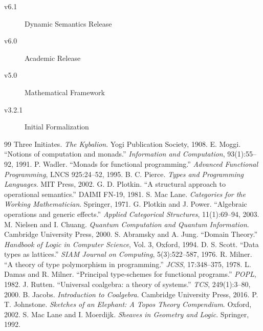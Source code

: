 \documentclass[11pt,twoside,openright]{book}
\theoremstyle{definition}
\theoremstyle{plain}
\theoremstyle{remark}
\begin{document}
\begin{description}
\item[v6.1] Dynamic Semantics Release

\item[v6.0] Academic Release

\item[v5.0] Mathematical Framework

\item[v3.2.1] Initial Formalization
\end{description}

\backmatter

\begin{thebibliography}{99}
 Three Initiates. \textit{The Kybalion}. Yogi Publication Society, 1908.
 E. Moggi. ``Notions of computation and monads.'' \textit{Information and Computation}, 93(1):55--92, 1991.
 P. Wadler. ``Monads for functional programming.'' \textit{Advanced Functional Programming}, LNCS 925:24--52, 1995.
 B. C. Pierce. \textit{Types and Programming Languages}. MIT Press, 2002.
 G. D. Plotkin. ``A structural approach to operational semantics.'' DAIMI FN-19, 1981.
 S. Mac Lane. \textit{Categories for the Working Mathematician}. Springer, 1971.
 G. Plotkin and J. Power. ``Algebraic operations and generic effects.'' \textit{Applied Categorical Structures}, 11(1):69--94, 2003.
 M. Nielsen and I. Chuang. \textit{Quantum Computation and Quantum Information}. Cambridge University Press, 2000.
 S. Abramsky and A. Jung. ``Domain Theory.'' \textit{Handbook of Logic in Computer Science}, Vol. 3, Oxford, 1994.
 D. S. Scott. ``Data types as lattices.'' \textit{SIAM Journal on Computing}, 5(3):522--587, 1976.
 R. Milner. ``A theory of type polymorphism in programming.'' \textit{JCSS}, 17:348--375, 1978.
 L. Damas and R. Milner. ``Principal type-schemes for functional programs.'' \textit{POPL}, 1982.
 J. Rutten. ``Universal coalgebra: a theory of systems.'' \textit{TCS}, 249(1):3--80, 2000.
 B. Jacobs. \textit{Introduction to Coalgebra}. Cambridge University Press, 2016.
 P. T. Johnstone. \textit{Sketches of an Elephant: A Topos Theory Compendium}. Oxford, 2002.
 S. Mac Lane and I. Moerdijk. \textit{Sheaves in Geometry and Logic}. Springer, 1992.
\end{thebibliography}
\end{document}
